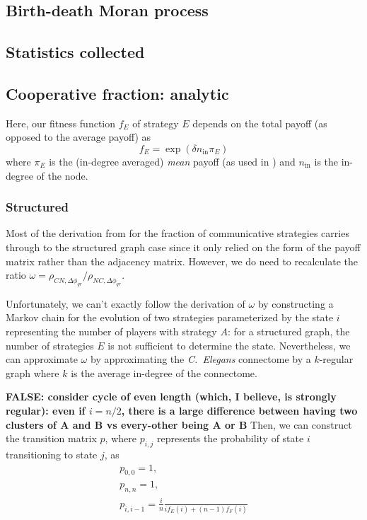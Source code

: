 \documentclass[pdflatex,lineno,referee,sn-mathphys-ay]{class/sn-jnl}
\begin{document}
\subsection{Birth-death Moran process}
\subsection{Statistics collected}
\subsection{Cooperative fraction: analytic}
Here, our fitness function $f_E$ of strategy $E$ depends on the total payoff (as opposed
to the average payoff) as
\begin{equation}
  f_E = \exp(\delta n_{\text{in}} \pi_E)
\end{equation}
where $\pi_E$ is the (in-degree averaged) \emph{mean} payoff (as used in
\cite{tripp2022evolutionary}) and $n_{\text{in}}$ is the in-degree of
the node.

\subsubsection{Structured}
Most of the derivation from \cite{tripp2022evolutionary} for the
fraction of communicative strategies carries through to the structured
graph case since it only relied on the form of the payoff matrix rather
than the adjacency matrix.
However, we do need to recalculate the ratio $\omega = \rho_{CN,\Delta
\phi_{qr}}/\rho_{NC,\Delta \phi_{qr}}$.

Unfortunately, we can't exactly follow the \cite{tripp2022evolutionary}
derivation of $\omega$ by constructing a Markov chain for the evolution
of two strategies parameterized by the state $i$ representing the number
of players with strategy $A$:
for a structured graph, the number of strategies $E$ is not sufficient
to determine the state.
Nevertheless, we can approximate $\omega$ by approximating the \emph{C.\
Elegans} connectome by a $k$-regular graph where $k$ is the average
in-degree of the connectome.

\textbf{FALSE: consider cycle of even length (which, I believe, is
  strongly regular): even if $i=n/2$, there is a large difference
between having two clusters of A and B vs every-other being A or B}
Then, we can construct the transition matrix $p$, where $p_{i,j}$
represents the probability of state $i$ transitioning to state $j$, as
\begin{gather*}
  p_{0,0} = 1, \\
  p_{n,n} = 1, \\
  p_{i,i-1} = \frac{i}{n} \frac{}
                              {i f_E(i) + (n-1) f_F(i)}
\end{gather*}
\end{document}
